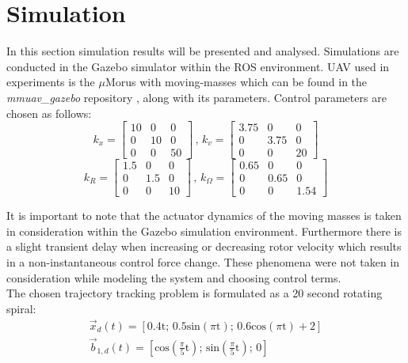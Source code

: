 \section{Simulation}

In this section simulation results will be presented and analysed. Simulations are conducted in the Gazebo simulator within the ROS environment. UAV used in experiments is the $\mu$Morus with moving-masses which can be found in the \textit{mmuav\_gazebo} repository \cite{gitLink}, along with its parameters. 
Control parameters are chosen as follows:
\begin{equation*}
	k_x = 
	\begin{bmatrix}
		10 &  0  &  0 \\
		 0 & 10  &	0 \\ 
		 0 &  0  & 50 	
	\end{bmatrix}
	\, , \,	
	k_v =
	\begin{bmatrix}
		3.75 & 0 & 0 \\
		0 & 3.75 & 0 \\
		0 & 0 & 20
	\end{bmatrix}
\end{equation*}
\begin{equation*}
	k_R = 
	\begin{bmatrix}
		1.5 & 0 & 0 \\
		0 & 1.5 & 0 \\
		0 & 0 & 10
	\end{bmatrix}
	\, , \,
	k_\Omega = 
	\begin{bmatrix}
		0.65 & 0 & 0 \\
		0 & 0.65 & 0 \\
		0 & 0 & 1.54
	\end{bmatrix}
\end{equation*}

It is important to note that the actuator dynamics of the moving masses is taken in consideration within the Gazebo simulation environment. Furthermore there is a slight transient delay when increasing or decreasing rotor velocity which results in a non-instantaneous control force change. These phenomena were not taken in consideration while modeling the system and choosing control terms. \\

The chosen trajectory tracking problem is formulated as a 20 second rotating spiral:
\begin{gather*}
	\vec{x}_d(t) = [0.4\text{t}; \, 0.5\text{sin}(\pi\text{t}); \, 0.6\text{cos}(\pi\text{t}) + 2] \\
	\vec{b}_{1,d}(t) = [\text{cos}\left(\frac{\pi}{5}\text{t}\right); \, \text{sin}\left(\frac{\pi}{5}\text{t}\right); \, 0]
\end{gather*}

